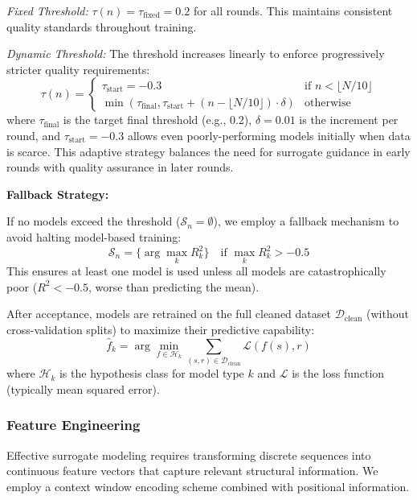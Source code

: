 \documentclass[conference]{IEEEtran}
\begin{document}
\textit{Fixed Threshold:} $\tau(n) = \tau_{\text{fixed}} = 0.2$ for all rounds. This maintains consistent quality standards throughout training.

\textit{Dynamic Threshold:} The threshold increases linearly to enforce progressively stricter quality requirements:
\begin{equation}
\tau(n) = \begin{cases}
\tau_{\text{start}} = -0.3 & \text{if } n < \lfloor N/10 \rfloor \\
\min(\tau_{\text{final}}, \tau_{\text{start}} + (n - \lfloor N/10 \rfloor) \cdot \delta) & \text{otherwise}
\end{cases}
\end{equation}
where $\tau_{\text{final}}$ is the target final threshold (e.g., 0.2), $\delta = 0.01$ is the increment per round, and $\tau_{\text{start}} = -0.3$ allows even poorly-performing models initially when data is scarce. This adaptive strategy balances the need for surrogate guidance in early rounds with quality assurance in later rounds.

\textbf{Fallback Strategy:}

If no models exceed the threshold ($\mathcal{S}_n = \emptyset$), we employ a fallback mechanism to avoid halting model-based training:
\begin{equation}
\mathcal{S}_n = \{\arg\max_k R^2_k\} \quad \text{if } \max_k R^2_k > -0.5
\end{equation}
This ensures at least one model is used unless all models are catastrophically poor ($R^2 < -0.5$, worse than predicting the mean).

After acceptance, models are retrained on the full cleaned dataset $\mathcal{D}_{\text{clean}}$ (without cross-validation splits) to maximize their predictive capability:
\begin{equation}
\hat{f}_k = \arg\min_{f \in \mathcal{H}_k} \sum_{(s, r) \in \mathcal{D}_{\text{clean}}} \mathcal{L}(f(s), r)
\end{equation}
where $\mathcal{H}_k$ is the hypothesis class for model type $k$ and $\mathcal{L}$ is the loss function (typically mean squared error).

\subsubsection{Feature Engineering}

Effective surrogate modeling requires transforming discrete sequences into continuous feature vectors that capture relevant structural information. We employ a context window encoding scheme combined with positional information.
\end{document}

